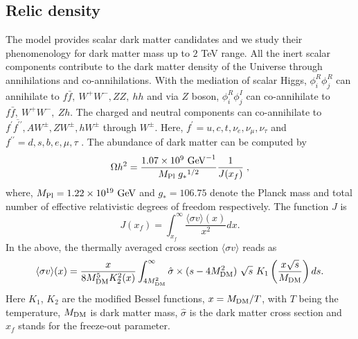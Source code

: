 \documentclass[aps, a4paper,superscriptaddress,12pt,preprintnumbers,floatfix,nofootinbib,amsmath,amssymb]{revtex4}
\begin{document}
\subsection{Relic density}
The model provides scalar dark matter candidates and we study their phenomenology for dark matter mass up to $2$ TeV range. All the inert scalar components contribute to the dark matter density of the Universe through annihilations and co-annihilations. With the mediation of scalar Higgs, $\phi^R_i \phi^R_j$ can annihilate to $f\bar{f}, ~W^+W^-,ZZ, ~hh$ and via $Z$ boson, $\phi^R_i \phi^I_j$ can co-annihilate to $f\bar{f}, ~W^+W^-,~ Zh$. The charged and neutral components can co-annihilate to $f^\prime \overline{f^{\prime\prime}}, A W^\pm, Z W^\pm, h W^\pm$ through $W^\pm$. Here, $f^\prime = u,c,t,\nu_e,\nu_\mu, \nu_\tau$ and $f^{\prime\prime} = d,s,b,e,\mu,\tau$ \cite{LopezHonorez:2006gr, Barbieri:2006dq, Dolle:2009fn}. The abundance of dark matter can be computed by
\begin{equation}
\label{eq:relicdensity}
\Omega h^2 = \frac{1.07 \times 10^{9} ~{\rm{GeV}}^{-1}}{  M_{\rm{Pl}}\; {g_\ast}^{1/2}}\frac{1}{J(x_f)}\;,
\end{equation}
%
where, $M_{\rm{Pl}}=1.22 \times 10^{19} ~\rm{GeV}$ and $g_\ast = 106.75$ denote the Planck mass and total number of effective relativistic degrees of freedom respectively. The function $J$ is
%
\begin{equation}
J(x_f)=\int_{x_f}^{\infty} \frac{ \langle \sigma v \rangle (x)}{x^2} dx.
\end{equation}
%
In the above, the thermally averaged cross section $\langle \sigma v \rangle$ reads  as
%
\begin{equation}
 \langle\sigma v\rangle (x) = \frac{x}{8 M_{\rm DM}^5 K_2^2(x)} \int_{4 M_{\rm DM}^2}^\infty \hat{\sigma} \times ( s - 4 M_{\rm DM}^2) \ \sqrt{s} \ K_1 \left(\frac{x \sqrt{s}}{M_{\rm DM}}\right) ds.
\end{equation}
Here $K_1$, $K_2$ are the modified Bessel functions, $x = M_{\rm DM}/T$, with $T$ being the temperature, $M_{\rm  DM}$ is dark matter mass, $\hat  \sigma$ is the dark matter cross section and $x_f$ stands for the freeze-out parameter. 
\end{document}

